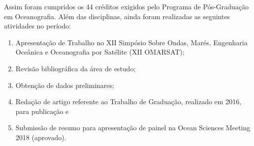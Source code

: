 \bigskip

\hspace{5mm} Assim foram cumpridos os 44 créditos exigidos pelo Programa de Pós-Graduação em Oceanografia. Além das disciplinas, ainda foram realizadas as seguintes atividades no período:

\vspace{-\topsep}
\begin{enumerate}[noitemsep]
    \item Apresentação de Trabalho no XII Simpósio Sobre Ondas, Marés, Engenharia Oceânica e Oceanografia por Satélite (XII OMARSAT);
    \item Revisão bibliográfica da área de estudo;
    \item Obtenção de dados preliminares;
    \item Redação de artigo referente ao Trabalho de Graduação, realizado em 2016, \\ para publicação e
    \item Submissão de resumo para apresentação de painel na Ocean Sciences Meeting 2018 (aprovado).
\end{enumerate}